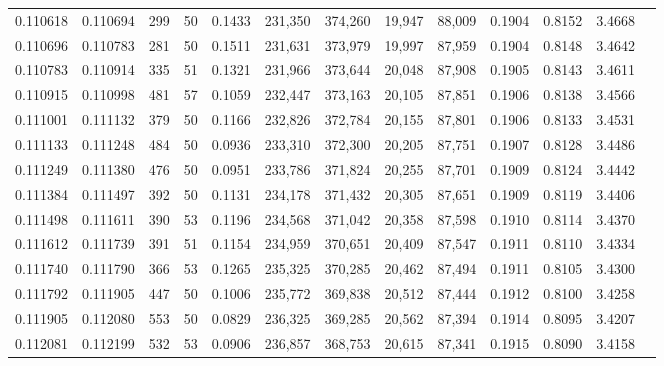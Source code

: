 \begin{tabular}{rrrrrrrrrrrrr}
0.110618 & 0.110694 &   299 &  50 &                                     0.1433 & 231,350 & 374,260 &  19,947 &  88,009 & 0.1904 & 0.8152 & 3.4668 \\
0.110696 & 0.110783 &   281 &  50 &                                     0.1511 & 231,631 & 373,979 &  19,997 &  87,959 & 0.1904 & 0.8148 & 3.4642 \\
0.110783 & 0.110914 &   335 &  51 &                                     0.1321 & 231,966 & 373,644 &  20,048 &  87,908 & 0.1905 & 0.8143 & 3.4611 \\
0.110915 & 0.110998 &   481 &  57 &                                     0.1059 & 232,447 & 373,163 &  20,105 &  87,851 & 0.1906 & 0.8138 & 3.4566 \\
0.111001 & 0.111132 &   379 &  50 &                                     0.1166 & 232,826 & 372,784 &  20,155 &  87,801 & 0.1906 & 0.8133 & 3.4531 \\
0.111133 & 0.111248 &   484 &  50 &                                     0.0936 & 233,310 & 372,300 &  20,205 &  87,751 & 0.1907 & 0.8128 & 3.4486 \\
0.111249 & 0.111380 &   476 &  50 &                                     0.0951 & 233,786 & 371,824 &  20,255 &  87,701 & 0.1909 & 0.8124 & 3.4442 \\
0.111384 & 0.111497 &   392 &  50 &                                     0.1131 & 234,178 & 371,432 &  20,305 &  87,651 & 0.1909 & 0.8119 & 3.4406 \\
0.111498 & 0.111611 &   390 &  53 &                                     0.1196 & 234,568 & 371,042 &  20,358 &  87,598 & 0.1910 & 0.8114 & 3.4370 \\
0.111612 & 0.111739 &   391 &  51 &                                     0.1154 & 234,959 & 370,651 &  20,409 &  87,547 & 0.1911 & 0.8110 & 3.4334 \\
0.111740 & 0.111790 &   366 &  53 &                                     0.1265 & 235,325 & 370,285 &  20,462 &  87,494 & 0.1911 & 0.8105 & 3.4300 \\
0.111792 & 0.111905 &   447 &  50 &                                     0.1006 & 235,772 & 369,838 &  20,512 &  87,444 & 0.1912 & 0.8100 & 3.4258 \\
0.111905 & 0.112080 &   553 &  50 &                                     0.0829 & 236,325 & 369,285 &  20,562 &  87,394 & 0.1914 & 0.8095 & 3.4207 \\
0.112081 & 0.112199 &   532 &  53 &                                     0.0906 & 236,857 & 368,753 &  20,615 &  87,341 & 0.1915 & 0.8090 & 3.4158 \\

\end{tabular}

